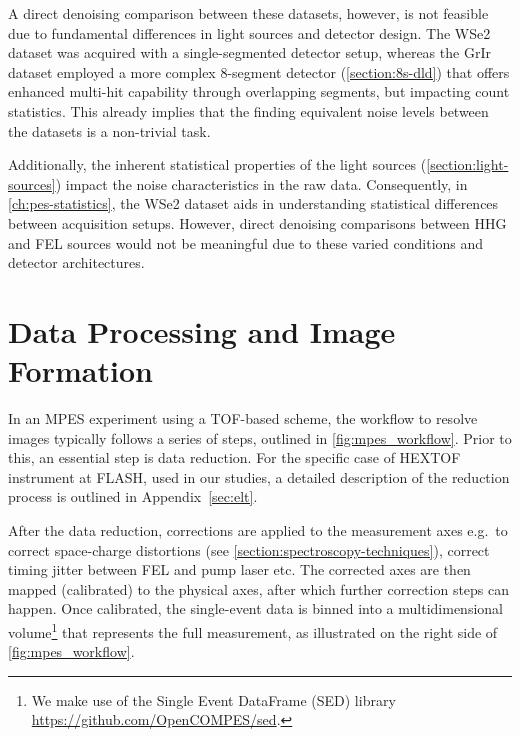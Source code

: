 A direct denoising comparison between these datasets, however, is not feasible due to fundamental differences in light sources and detector design. The \gls{WSe2} dataset was acquired with a single-segmented detector setup, whereas the \gls{GrIr} dataset employed a more complex 8-segment detector (\cref{section:8s-dld}) that offers enhanced multi-hit capability through overlapping segments, but impacting count statistics. This already implies that the finding equivalent noise levels between the datasets is a non-trivial task.

Additionally, the inherent statistical properties of the light sources (\cref{section:light-sources}) impact the noise characteristics in the raw data. Consequently, in \cref{ch:pes-statistics}, the \gls{WSe2} dataset aids in understanding statistical differences between acquisition setups. However, direct denoising comparisons between \gls{HHG} and \gls{FEL} sources would not be meaningful due to these varied conditions and detector architectures.

\section{Data Processing and Image Formation}\label{sec:image-formation}

In an \gls{MPES} experiment using a \gls{TOF}-based scheme, the workflow to resolve images typically follows a series of steps, outlined in \cref{fig:mpes_workflow}. Prior to this, an essential step is data reduction. For the specific case of \gls{HEXTOF} instrument at \gls{FLASH}, used in our studies, a detailed description of the reduction process is outlined in Appendix~\ref{sec:elt}.

After the data reduction, corrections are applied to the measurement axes  e.g.\ to correct space-charge distortions (see \cref{section:spectroscopy-techniques}), correct timing jitter between \gls{FEL} and pump laser etc. The corrected axes are then mapped (calibrated) to the physical axes, after which further correction steps can happen. Once calibrated, the single-event data is binned into a multidimensional volume\footnote{We make use of the Single Event DataFrame (SED) library \href{https://github.com/OpenCOMPES/sed}{https://github.com/OpenCOMPES/sed}.} that represents the full measurement, as illustrated on the right side of \cref{fig:mpes_workflow}.

